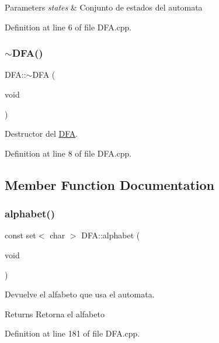 \begin{DoxyParams}{Parameters}
{\em states} & Conjunto de estados del automata \\
\hline
\end{DoxyParams}


Definition at line 6 of file D\+F\+A.\+cpp.

\mbox{\label{class_d_f_a_aa6398a02d0f2d3a57cee0c7d8b3ec9e1}} 
\subsubsection{\texorpdfstring{$\sim$\+D\+F\+A()}{~DFA()}}
{\footnotesize\ttfamily D\+F\+A\+::$\sim$\+D\+FA (\begin{DoxyParamCaption}\item[{void}]{ }\end{DoxyParamCaption})}



Destructor del \hyperlink{class_d_f_a}{D\+FA}. 



Definition at line 8 of file D\+F\+A.\+cpp.



\subsection{Member Function Documentation}
\mbox{\label{class_d_f_a_a0884e79fd0a48a42e49fe7854a19628d}} 
\subsubsection{\texorpdfstring{alphabet()}{alphabet()}}
{\footnotesize\ttfamily const set$<$ char $>$ D\+F\+A\+::alphabet (\begin{DoxyParamCaption}\item[{void}]{ }\end{DoxyParamCaption})}



Devuelve el alfabeto que usa el automata. 

\begin{DoxyReturn}{Returns}
Retorna el alfabeto 
\end{DoxyReturn}


Definition at line 181 of file D\+F\+A.\+cpp.

